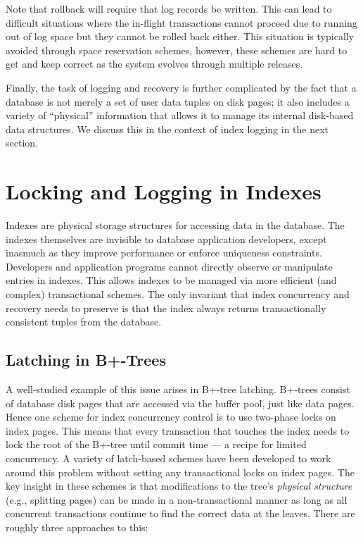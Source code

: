 \documentclass[b5paper,11pt,twoside,openright]{book}
\begin{document}
Note that rollback will require that log records be written. This can
lead to difficult situations where the in-flight transactions cannot
proceed due to running out of log space but they cannot be rolled back
either. This situation is typically avoided through space reservation
schemes, however, these schemes are hard to get and keep correct as the
system evolves through multiple releases.

Finally, the task of logging and recovery is further complicated by the
fact that a database is not merely a set of user data tuples on disk
pages; it also includes a variety of ``physical'' information that
allows it to manage its internal disk-based data structures. We discuss
this in the context of index logging in the next section.

\hypertarget{locking-and-logging-in-indexes}{%
\section{Locking and Logging in
Indexes}\label{locking-and-logging-in-indexes}}

Indexes are physical storage structures for accessing data in the
database. The indexes themselves are invisible to database application
developers, except inasmuch as they improve performance or enforce
uniqueness constraints. Developers and application programs cannot
directly observe or manipulate entries in indexes. This allows indexes
to be managed via more efficient (and complex) transactional schemes.
The only invariant that index concurrency and recovery needs to preserve
is that the index always returns transactionally consistent tuples from
the database.

\hypertarget{latching-in-b-trees}{%
\subsection{Latching in B+-Trees}\label{latching-in-b-trees}}

A well-studied example of this issue arises in B+-tree latching.
B+-trees consist of database disk pages that are accessed via the buffer
pool, just like data pages. Hence one scheme for index concurrency
control is to use two-phase locks on index pages. This means that every
transaction that touches the index needs to lock the root of the B+-tree
until commit time --- a recipe for limited concurrency. A variety of
latch-based schemes have been developed to work around this problem
without setting any transactional locks on index pages. The key insight
in these schemes is that modifications to the tree's \emph{physical
structure} (e.g., splitting pages) can be made in a non-transactional
manner as long as all concurrent transactions continue to find the
correct data at the leaves. There are roughly three approaches to this:
\end{document}
